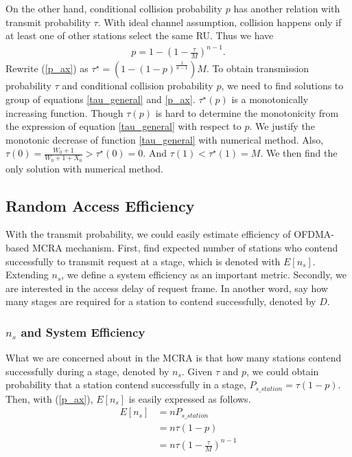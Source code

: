 \documentclass[journal]{IEEEtran}
\begin{document}
On the other hand, conditional collision probability $p$ has another relation with transmit probability $\tau$. 
With ideal channel assumption, collision happens only if at least one of other stations select the same RU.
Thus we have 
\begin{align}
\label{p_ax}
p = 1-\left( 1-\frac{\tau}{M} \right)^{n-1}.
\end{align}
Rewrite (\ref{p_ax}) as $\tau^\star = \left(1-(1-p)^\frac{1}{n-1} \right)M$. 
To obtain transmission probability $\tau$ and conditional collision probability $p$, we need to find solutions to group of equations \ref{tau_general} and \ref{p_ax}.
$\tau^\star(p)$ is a monotonically increasing function. 
Though $\tau(p)$ is hard to determine the monotonicity from the expression of equation \ref{tau_general} with respect to $p$. 
We justify the monotonic decrease of function \ref{tau_general} with numerical method. 
Also, $\tau(0) = \frac{W_0+1}{W_0+1+X_0}> \tau^\star(0) = 0$.
And $\tau(1) < \tau^\star(1) = M$. 
We then find the only solution with numerical method.



\subsection{Random Access Efficiency}
With the transmit probability, we could easily estimate efficiency of OFDMA-based MCRA mechanism. 
First, find expected number of stations who contend successfully to transmit request at a stage, which is denoted with $E[n_s]$. 
Extending $n_s$, we define a system efficiency as an important metric.
Secondly, we are interested in the access delay of request frame. 
In another word, say how many stages are required for a station to contend successfully, denoted by $D$.

\subsubsection{$n_s$ and System Efficiency}
What we are concerned about in the MCRA is that how many stations contend successfully during a stage, denoted by $n_s$.
Given $\tau$ and $p$, we could obtain probability that a station contend successfully in a stage, $P_{s\_station} = \tau (1-p)$.
Then, with (\ref{p_ax}), $E[n_s]$ is easily expressed as follows. 
\begin{align}
\label{equ_ns}
E[n_s] &= n P_{s\_station} \nonumber \\
		&= n\tau (1-p) \nonumber \\
		&= n\tau (1-\frac{\tau}{M})^{n-1}
\end{align}
\end{document}
